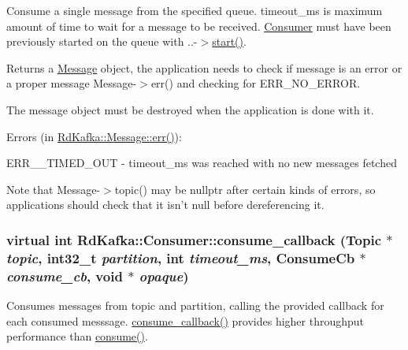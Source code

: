 Consume a single message from the specified queue. {\ttfamily timeout\_\-ms} is maximum amount of time to wait for a message to be received. \hyperlink{classRdKafka_1_1Consumer}{Consumer} must have been previously started on the queue with {\ttfamily }..-\/$>$\hyperlink{classRdKafka_1_1Consumer_ad2044e3433f626baff667e1a429d6f33}{start()}.

\begin{DoxyReturn}{Returns}
a \hyperlink{classRdKafka_1_1Message}{Message} object, the application needs to check if message is an error or a proper message {\ttfamily Message-\/$>$err()} and checking for {\ttfamily ERR\_\-NO\_\-ERROR}.
\end{DoxyReturn}
The message object must be destroyed when the application is done with it.

Errors (in \hyperlink{classRdKafka_1_1Message_a90df1fd2a73a74220c9581e6bedb42f2}{RdKafka::Message::err()}):
\begin{DoxyItemize}
\item ERR\_\-\_\-TIMED\_\-OUT -\/ {\ttfamily timeout\_\-ms} was reached with no new messages fetched
\end{DoxyItemize}

Note that Message-\/$>$topic() may be nullptr after certain kinds of errors, so applications should check that it isn't null before dereferencing it. \hypertarget{classRdKafka_1_1Consumer_a15a3e64a1ed777804df8b4ea02a40887}{
\subsubsection[{consume\_\-callback}]{\setlength{\rightskip}{0pt plus 5cm}virtual int RdKafka::Consumer::consume\_\-callback ({\bf Topic} $\ast$ {\em topic}, \/  int32\_\-t {\em partition}, \/  int {\em timeout\_\-ms}, \/  {\bf ConsumeCb} $\ast$ {\em consume\_\-cb}, \/  void $\ast$ {\em opaque})}}
\label{classRdKafka_1_1Consumer_a15a3e64a1ed777804df8b4ea02a40887}


Consumes messages from {\ttfamily topic} and {\ttfamily partition}, calling the provided callback for each consumed messsage. {\ttfamily \hyperlink{classRdKafka_1_1Consumer_a15a3e64a1ed777804df8b4ea02a40887}{consume\_\-callback()}} provides higher throughput performance than {\ttfamily \hyperlink{classRdKafka_1_1Consumer_a0afd32e342283fc10fa6f32cc25950b7}{consume()}}.

